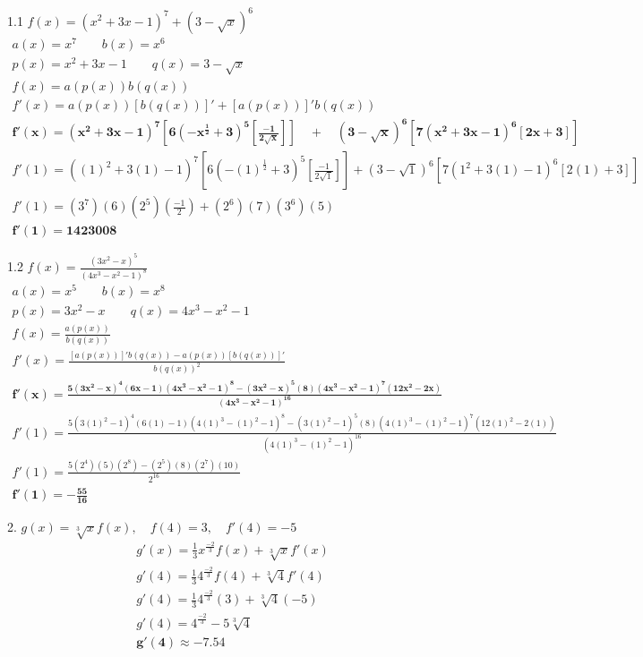 \documentclass[12pt, letterpaper]{article}
\begin{document}
\color{myColor}
\everymath{\displaystyle}

1.1 \quad $ f(x) = (x^2 + 3x - 1)^7 + (3 - \sqrt{x})^6 $
\begin{gather*}
    a(x) = x^7 \qquad
    b(x) = x^6 \\
    p(x) = x^2 + 3x - 1 \qquad q(x) = 3 - \sqrt{x} \\[8mm]
    f(x) = a(p(x))b(q(x)) \\
    f'(x) = a(p(x))[b(q(x))]' + [a(p(x))]'b(q(x)) \\
    \bm{f'(x) = (x^2 + 3x - 1)^7[6(-x^{\frac{1}{2}} + 3)^5\left[\frac{-1}{2\sqrt{x}}\right]] \quad + \quad
            (3 - \sqrt{x})^6[7(x^2 + 3x - 1)^6[2x+3]]} \\[8mm]
    f'(1) = ((1)^2 + 3(1) - 1)^7[6(-(1)^{\frac{1}{2}} + 3)^5\left[\frac{-1}{2\sqrt{1}}\right]] +
            (3 - \sqrt{1})^6[7(1^2 + 3(1) - 1)^6[2(1)+3]] \\
    f'(1) = (3^7)(6)(2^5)\left(\frac{-1}{2}\right) +
            (2^6)(7)(3^6)(5) \\
    \bm{f'(1) = 1423008}
\end{gather*}

1.2 \quad $ f(x) = \frac{(3x^2 - x)^5}{(4x^3 - x^2 - 1)^8}$
\begin{gather*}
    a(x) = x^5 \qquad
    b(x) = x^8 \\
    p(x) = 3x^2 - x \qquad q(x) = 4x^3 - x^2 - 1 \\[8mm]
    f(x) = \frac{a(p(x))}{b(q(x))} \\
    f'(x) = \frac{[a(p(x))]'b(q(x)) - a(p(x))[b(q(x))]'}{b(q(x))^2} \\
    \bm{f'(x) = \frac   {5(3x^2 - x)^4(6x-1)(4x^3 - x^2 - 1)^8 - (3x^2 - x)^5(8)(4x^3 - x^2 - 1)^7(12x^2 - 2x)}
                        {(4x^3 - x^2 - 1)^{16}}} \\[8mm]
    f'(1) = \frac   {5(3(1)^2 - 1)^4(6(1)-1)(4(1)^3 - (1)^2 - 1)^8 - (3(1)^2 - 1)^5(8)(4(1)^3 - (1)^2 - 1)^7(12(1)^2 - 2(1))}
                    {(4(1)^3 - (1)^2 - 1)^{16}} \\
    f'(1) = \frac{5(2^4)(5)(2^8) - (2^5)(8)(2^7)(10)}{2^{16}} \\
    \bm{f'(1) = -\frac{55}{16}}
\end{gather*}

2. \quad $ g(x) = \sqrt[3]{x}f(x), \quad f(4) = 3, \quad f'(4) = -5 $
\begin{gather*}
    g'(x) = \frac{1}{3}x^{\frac{-2}{3}}f(x) + \sqrt[3]{x}f'(x) \\
    g'(4) = \frac{1}{3}4^{\frac{-2}{3}}f(4) + \sqrt[3]{4}f'(4) \\
    g'(4) = \frac{1}{3}4^{\frac{-2}{3}}(3) + \sqrt[3]{4}(-5) \\
    g'(4) = 4^{\frac{-2}{3}} - 5\sqrt[3]{4}\\
    \bm{g'(4) \approx -7.54}
\end{gather*}
\end{document}
